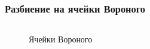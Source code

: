 \documentclass[pdf,hyperref={unicode}]{beamer}
\begin{document}
\begin{frame}%
\transdissolve[duration=0.2]
\frametitle{Разбиение на ячейки Вороного}

\begin{columns}

{
\begin{column}{0.3\linewidth}
\begin{figure}[h]
\caption{\tiny Ячейки Вороного}
\end{figure}
\end{column}
}


\end{columns}
\end{frame}
\end{document}
